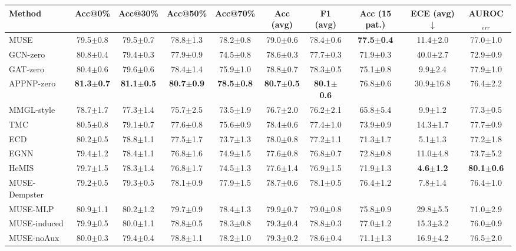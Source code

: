 \begin{tabular}{lccccccccc}
\toprule
Method & Acc@0\% & Acc@30\% & Acc@50\% & Acc@70\% & Acc (avg) & F1 (avg) & Acc (15 pat.) & ECE (avg)$\downarrow$ & AUROC$_{err}$ \\
\midrule
MUSE & 79.5$\pm$0.8 & 79.5$\pm$0.7 & 78.8$\pm$1.3 & 78.2$\pm$0.8 & 79.0$\pm$0.6 & 78.4$\pm$0.6 & \textbf{77.5$\pm$0.4} & 11.4$\pm$2.0 & 77.0$\pm$1.0 \\
GCN-zero & 80.8$\pm$0.4 & 79.4$\pm$0.3 & 77.9$\pm$0.9 & 74.5$\pm$0.8 & 78.6$\pm$0.3 & 77.7$\pm$0.3 & 71.9$\pm$0.3 & 40.0$\pm$2.7 & 72.9$\pm$0.9 \\
GAT-zero & 80.4$\pm$0.6 & 79.6$\pm$0.6 & 78.4$\pm$1.4 & 75.9$\pm$1.0 & 78.8$\pm$0.7 & 78.3$\pm$0.5 & 75.1$\pm$0.8 & 9.9$\pm$2.4 & 77.9$\pm$1.0 \\
APPNP-zero & \textbf{81.3$\pm$0.7} & \textbf{81.1$\pm$0.5} & \textbf{80.7$\pm$0.9} & \textbf{78.5$\pm$0.8} & \textbf{80.7$\pm$0.5} & \textbf{80.1$\pm$0.6} & 76.8$\pm$0.6 & 30.9$\pm$16.8 & 76.4$\pm$2.2 \\
MMGL-style & 78.7$\pm$1.7 & 77.3$\pm$1.4 & 75.7$\pm$2.5 & 73.5$\pm$1.9 & 76.7$\pm$2.0 & 76.2$\pm$2.1 & 65.8$\pm$5.4 & 9.9$\pm$1.2 & 77.3$\pm$0.5 \\
TMC & 80.5$\pm$0.8 & 79.1$\pm$0.7 & 77.6$\pm$0.8 & 75.6$\pm$0.9 & 78.4$\pm$0.6 & 77.4$\pm$1.0 & 73.9$\pm$0.9 & 14.3$\pm$1.7 & 77.7$\pm$0.9 \\
ECD & 80.2$\pm$0.5 & 78.8$\pm$1.1 & 77.5$\pm$1.7 & 73.7$\pm$1.3 & 78.0$\pm$0.8 & 77.2$\pm$1.1 & 71.3$\pm$1.7 & 5.1$\pm$1.3 & 77.2$\pm$1.8 \\
EGNN & 79.4$\pm$1.2 & 78.4$\pm$1.1 & 76.8$\pm$1.6 & 74.9$\pm$1.5 & 77.6$\pm$0.8 & 76.8$\pm$0.7 & 72.8$\pm$0.8 & 11.0$\pm$4.8 & 73.7$\pm$5.2 \\
HeMIS & 79.7$\pm$1.5 & 78.3$\pm$1.4 & 76.8$\pm$1.7 & 74.5$\pm$1.3 & 77.6$\pm$1.4 & 76.9$\pm$1.5 & 71.9$\pm$1.3 & \textbf{4.6$\pm$1.2} & \textbf{80.1$\pm$0.6} \\
\midrule
MUSE-Dempster & 79.2$\pm$0.5 & 79.3$\pm$0.5 & 78.1$\pm$0.9 & 77.9$\pm$1.5 & 78.7$\pm$0.6 & 78.1$\pm$0.5 & 76.4$\pm$1.2 & 7.8$\pm$1.4 & 76.4$\pm$1.0 \\
MUSE-MLP & 80.9$\pm$1.1 & 80.2$\pm$1.2 & 79.7$\pm$0.9 & 78.4$\pm$1.3 & 79.9$\pm$0.7 & 79.0$\pm$0.8 & 75.8$\pm$0.9 & 29.8$\pm$5.5 & 71.0$\pm$2.9 \\
MUSE-induced & 79.9$\pm$0.5 & 80.0$\pm$1.1 & 78.8$\pm$0.5 & 78.3$\pm$0.8 & 79.3$\pm$0.4 & 78.8$\pm$0.3 & 77.0$\pm$1.2 & 15.3$\pm$3.2 & 76.0$\pm$0.9 \\
MUSE-noAux & 80.0$\pm$0.3 & 79.4$\pm$0.4 & 78.8$\pm$1.1 & 78.2$\pm$1.0 & 79.3$\pm$0.2 & 78.6$\pm$0.4 & 71.1$\pm$1.3 & 16.9$\pm$4.2 & 76.5$\pm$2.0 \\

\end{tabular}
